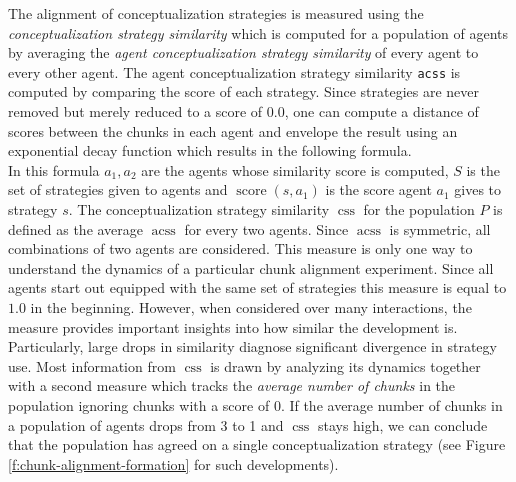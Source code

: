 The alignment of conceptualization strategies is measured using the
\emph{conceptualization strategy similarity} which is computed for a population of agents 
by averaging the \emph{agent conceptualization strategy similarity} of every agent to every other
agent. The agent conceptualization strategy similarity {\footnotesize\tt acss} is computed by comparing
the score of each strategy. Since strategies are never removed but merely reduced
to a score of $0.0$, one can compute a distance of scores between the chunks in each agent
and envelope the result using an exponential decay function which results in the following formula.
\begin{equation}
\end{equation}
In this formula $a_1,a_2$ are the agents whose similarity score is computed, $S$ is the set 
of strategies given
to agents and $\operatorname{score}(s,a_1)$ is the score agent $a_1$ gives to strategy $s$.
The conceptualization strategy similarity $\operatorname{css}$ for the population $P$ is defined 
as the average $\operatorname{acss}$
for every two agents. Since $\operatorname{acss}$ is symmetric, all combinations of two agents are
considered. This measure is only one way to understand the dynamics of a particular chunk alignment 
experiment. Since all agents start out equipped with the same set of strategies this measure is equal to $1.0$
in the beginning. However, when considered over many interactions, the measure provides important insights 
into how similar the development is. Particularly, large drops in similarity diagnose significant divergence in strategy use. Most information from $\operatorname{css}$ is drawn by analyzing its dynamics together with a 
second measure which tracks the \emph{average number of chunks} in the population ignoring chunks with a 
score of $0$. If the average number of chunks in a population of agents drops from 3 to 1 and 
$\operatorname{css}$ stays
high, we can conclude that the population has agreed on a single conceptualization strategy (see Figure
\ref{f:chunk-alignment-formation} for such developments). 

